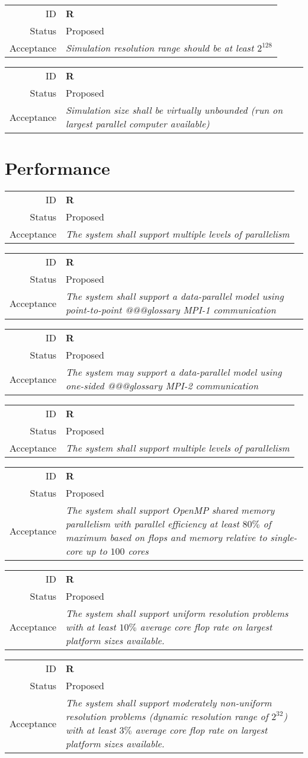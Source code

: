 \documentclass{book}
\newcommand{\req}[3]{
\begin{tabular}{rl}
ID & \textbf{R#1} \\
Status & \textsf{#2} \\
Acceptance & \textit{#3}
\end{tabular}
}
\begin{document}
\req
  {}
  {Proposed}
%
  {Simulation resolution range should be at least $2^128$}

\req
  {}
  {Proposed}
%
  {Simulation size shall be virtually unbounded (run on largest
  parallel computer available)}

\section{Performance}

\req
  {}
  {Proposed}
%
  {The system shall support multiple levels of parallelism}

\req
  {}
  {Proposed}
%
  {The system shall support a data-parallel model using point-to-point
  @@@glossary MPI-1 communication}

\req
  {}
  {Proposed}
%
  {The system may support a data-parallel model using one-sided
  @@@glossary MPI-2 communication}

\req
  {}
  {Proposed}
%
  {The system shall support multiple levels of parallelism}

\req
  {}
  {Proposed}
%
  {The system shall support OpenMP shared memory parallelism with
  parallel efficiency at least $80\%$ of maximum based on flops and
  memory relative to single-core up to $100$ cores}

\req
  {}
  {Proposed}
%
  {The system shall support uniform resolution problems with at least
  $10\%$ average core flop rate on largest platform sizes available.}

\req
  {}
  {Proposed}
%
  {The system shall support moderately non-uniform resolution problems
  (dynamic resolution range of $2^32$) with at least $3\%$ average
  core flop rate on largest platform sizes available.}
\end{document}
